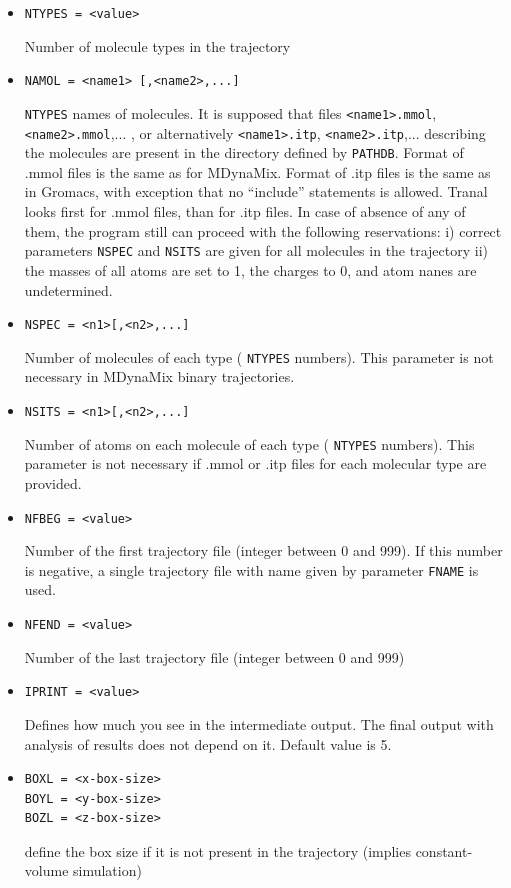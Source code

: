 \documentclass{article}
\begin{document}
\begin{itemize}
\item
\verb|NTYPES = <value>|

Number of molecule types in the trajectory

\item
\verb|NAMOL = <name1> [,<name2>,...]|

\verb|NTYPES| names of molecules. It is supposed that files 
\verb|<name1>.mmol|, \verb|<name2>.mmol|,... , or alternatively
\verb|<name1>.itp|, \verb|<name2>.itp|,... describing the molecules are
present in the directory defined by \verb|PATHDB|. Format of .mmol files is
the same as for MDynaMix. Format of .itp files is the same
as in Gromacs, with exception that no ``include'' statements is allowed.
Tranal looks first for .mmol files, than for .itp files. In case of absence
of any of them, the program still can proceed with the following reservations:
i) correct parameters \verb|NSPEC| and \verb|NSITS| are given for all
molecules in the trajectory ii) the masses of all atoms are set to 
1, the charges to 0, and atom nanes are undetermined.

\item
\verb|NSPEC = <n1>[,<n2>,...]|

Number of molecules of each type ( \verb|NTYPES| numbers). This parameter
is not necessary in MDynaMix binary trajectories.

\item
\verb|NSITS = <n1>[,<n2>,...]|

Number of atoms on each molecule of each type ( \verb|NTYPES| numbers). 
This parameter is not necessary if .mmol or .itp files for each molecular
type are provided.

\item
\verb|NFBEG = <value>|

Number of the first trajectory file (integer between 0 and 999). If this
number is negative, a single trajectory file with name given by
parameter \verb|FNAME| is used.

\item
\verb|NFEND = <value>|

Number of the last trajectory file (integer between 0 and 999)

\item
\verb|IPRINT = <value>|

Defines how much you see in the intermediate output. The final output with
analysis of results does not depend on it. Default value is 5.

\item
\begin{verbatim}
BOXL = <x-box-size>
BOYL = <y-box-size>
BOZL = <z-box-size>
\end{verbatim}
define the box size if it is not present in the trajectory
(implies constant-volume simulation)


\end{itemize}
\end{document}
